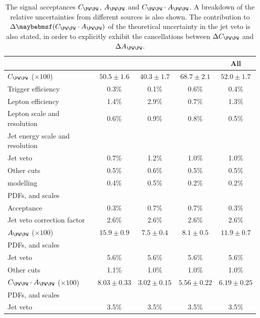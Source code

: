 \begin{table}
	\begin{tabular}{l@{}c@{\hskip 0.2in}c@{\hskip 0.2in}c@{\hskip 0.2in}c}
		\toprule
		& \emch & \eech & \mmch & All \\
		\midrule
		$C_{\WW}$ ($\times 100$) & $50.5\pm1.6$ & $40.3\pm1.7$ & $68.7\pm2.1$ & $52.0\pm1.7$ \\
		\quad Trigger efficiency & 0.3\% & 0.1\% & 0.6\% & 0.4\% \\
		\quad Lepton efficiency  & 1.4\% & 2.9\% & 0.7\% & 1.3\% \\
		\quad Lepton \pt scale and resolution & 0.6\% & 0.9\% & 0.8\% & 0.5\% \\
		\quad Jet energy scale and resolution \\
		\quad\quad Jet veto      & 0.7\% & 1.2\% & 1.0\% & 1.0\% \\
		\quad\quad Other cuts    & 0.5\% & 0.6\% & 0.5\% & 0.5\% \\
		\quad \met modelling     & 0.4\% & 0.5\% & 0.2\% & 0.2\% \\
		\quad PDFs, \mur and \muf scales \\
		\quad\quad Acceptance    & 0.3\% & 0.7\% & 0.7\% & 0.3\% \\
		\quad\quad Jet veto correction factor & 2.6\% & 2.6\% & 2.6\% & 2.6\% \\
		\cmidrule(lr){1-5}
		$A_{\WW}$ ($\times 100$) & $15.9\pm0.9$ & $7.5\pm0.4$ & $8.1\pm0.5$ & $11.9\pm0.7$ \\
		\quad PDFs, \mur and \muf scales \\
		\quad\quad Jet veto   & 5.6\% & 5.6\% & 5.6\% & 5.6\% \\
		\quad\quad Other cuts & 1.1\% & 1.0\% & 1.0\% & 1.0\% \\
		\cmidrule(lr){1-5}
		$C_{\WW} \cdot A_{\WW}$ ($\times 100$) & $8.03\pm0.33$ & $3.02\pm0.15$ & $5.56\pm0.22$ & $6.19\pm0.25$ \\
		\quad PDFs, \mur and \muf scales \\
		\quad\quad Jet veto   & 3.5\% & 3.5\% & 3.5\% & 3.5\% \\
		\bottomrule
	\end{tabular}
	\caption{The signal acceptances $C_{\WW}$, $A_{\WW}$ and $C_{\WW} \cdot A_{\WW}$. 
	A breakdown of the relative uncertainties from different sources is also shown. The 
	contribution to $\Delta \parenths{C_{\WW} \cdot A_{\WW}}$ of the theoretical 
	uncertainty in the jet veto is also stated, in order to explicitly exhibit the 
	cancellations between $\Delta C_{\WW}$ and $\Delta A_{\WW}$.}
	\label{tab:ww:cww_aww}
\end{table}



